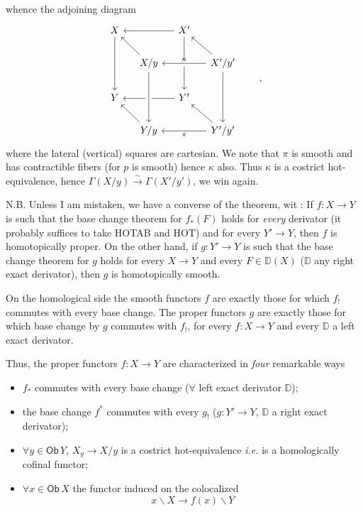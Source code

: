 \documentclass[11pt]{article}
\newcommand{\msp}[1]{\marginpar{\footnotesize [#1]}}
\newcommand{\Ob}{\mathsf{Ob}}
\newcommand{\DD}{\mathbb{D}}
\begin{document}
\noindent\msp{page 58}
whence the adjoining diagram
\[
\begin{tikzcd}[column sep=small]
X \arrow[dd] & & X' \arrow[ll] \arrow[dd] & \\
& X/y \arrow[ul] & & X'/y' \arrow[ll, crossing over, "\kappa"'] \arrow[ul] \arrow[dd] \\
Y & & Y' \arrow[ll] & \\
& Y/y \arrow[ul] \arrow[from=uu, crossing over] & & Y'/y' \arrow[ll, "\pi"] \arrow[ul]
\end{tikzcd}
\qquad ,
\]
where the lateral (vertical) squares are cartesian. We note that $\pi$ is smooth and has contractible fibers (for $p$ is smooth) hence $\kappa$ also. Thus $\kappa$ is a costrict hot-equivalence, hence $\Gamma(X/y) \overset{\sim}{\longrightarrow} \Gamma(X'/y')$, we win again.

\noindent N.B. Unless I am mistaken, we have a converse of the theorem, wit : If $f : X \to Y$ is such that the base change theorem for $f_*(F)$ holds for \textit{every} derivator (it probably suffices to take \textsf{HOTAB} and \textsf{HOT}) and for every $Y' \to Y$, then $f$ is homotopically proper. On the other hand, if $g : Y' \to Y$ is such that the base change theorem for $g$ holds for every $X \to Y$ and every $F \in \DD(X)$ ($\DD$ any right exact derivator), then $g$ is homotopically smooth. %

\noindent On the homological side the smooth functors $f$ are exactly those for which $f_!$ commutes with every base change. The proper functors $g$ are exactly those for which base change by $g$ commutes with $f_!$, for every $f : X \to Y$ and every $\DD$ a left exact derivator.

\noindent\msp{page 59}
Thus, the proper functors $f : X \to Y$ are characterized in \textit{four} remarkable ways
\begin{itemize}[label={}, leftmargin=0pt, itemindent=2\parindent, labelsep=0.3em]
\item[\textit{a})] $f_*$ commutes with every base change ($\forall$ left exact derivator $\DD$);
\item[\textit{b})] the base change $f^*$ commutes with every $g_!$ ($g : Y' \to Y$, $\DD$ a right exact derivator);
\item[\textit{c})] $\forall y \in \Ob\, Y$, $X_y \to X/y$ is a costrict hot-equivalence \textit{i.e.} is a homologically cofinal functor;
\item[\textit{d})] $\forall x \in \Ob\, X$ the functor induced on the colocalized
\[
x\backslash X \longrightarrow f(x)\backslash Y
\]
\end{itemize}
\end{document}

